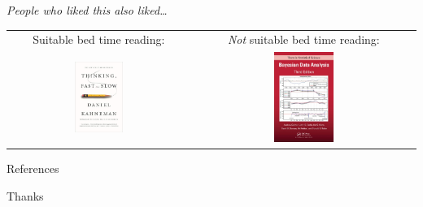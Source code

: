 \documentclass[aspectratio=169]{beamer}
\begin{document}
\begin{frame}{\emph{People who liked this also liked\ldots}}
  \centering
  \renewcommand{\arraystretch}{2}
  \setlength\tabcolsep{0.75cm}
  \begin{tabular}{cc}
    Suitable bed time reading:&
    \emph{Not} suitable bed time reading:\\
    \includegraphics[width=0.275\textwidth]{thinking.jpg}&
    \includegraphics[width=0.275\textwidth]{bda3.jpg} \\
  \end{tabular}
\end{frame}

\begin{frame}{References}
  \nocite{hilbe2017bayesian}
  
\end{frame}

\begin{frame}[standout]
  Thanks
\end{frame}
\end{document}
